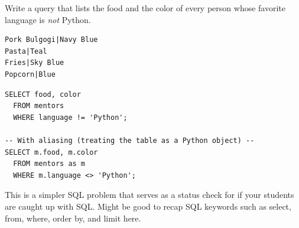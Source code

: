\begin{blocksection}
 Write a query that lists the food and the color of every person whose
favorite language is \emph{not} Python.

\begin{lstlisting}
Pork Bulgogi|Navy Blue
Pasta|Teal
Fries|Sky Blue
Popcorn|Blue
\end{lstlisting}

\begin{solution}[1in]
\begin{lstlisting}
SELECT food, color
  FROM mentors
  WHERE language != 'Python';

-- With aliasing (treating the table as a Python object) --
SELECT m.food, m.color
  FROM mentors as m
  WHERE m.language <> 'Python';
\end{lstlisting}
\end{solution}
\end{blocksection}

\begin{blocksection}
\begin{guide}
This is a simpler SQL problem that serves as a status check for if your students are caught up with SQL. Might be good to recap SQL keywords such as select, from, where, order by, and limit here.
\end{guide}
\end{blocksection}
